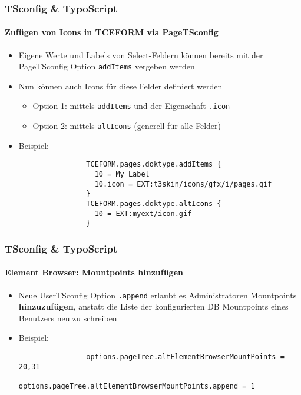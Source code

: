 \begin{frame}[fragile]
	\frametitle{TSconfig \& TypoScript}
	\framesubtitle{Zufügen von Icons in TCEFORM via PageTSconfig}

	\begin{itemize}
		\item Eigene Werte und Labels von Select-Feldern können bereits mit der PageTSconfig Option \texttt{addItems} vergeben werden
		\item Nun können auch Icons für diese Felder definiert werden

			\begin{itemize}
				\item Option 1: mittels \texttt{addItems} und der Eigenschaft \texttt{.icon}
				\item Option 2: mittels \texttt{altIcons} (generell für alle Felder)
			\end{itemize}

		\item Beispiel:

			\begin{lstlisting}
				TCEFORM.pages.doktype.addItems {
				  10 = My Label
				  10.icon = EXT:t3skin/icons/gfx/i/pages.gif
				}
				TCEFORM.pages.doktype.altIcons {
				  10 = EXT:myext/icon.gif
				}
			\end{lstlisting}

	\end{itemize}

\end{frame}


\begin{frame}[fragile]
	\frametitle{TSconfig \& TypoScript}
	\framesubtitle{Element Browser: Mountpoints hinzufügen}

	\begin{itemize}
		\item Neue UserTSconfig Option \texttt{.append} erlaubt es Administratoren Mountpoints
			\textbf{hinzuzufügen}, anstatt die Liste der konfigurierten DB Mountpoints eines
			Benutzers neu zu schreiben

		\item Beispiel:

			\begin{lstlisting}
				options.pageTree.altElementBrowserMountPoints = 20,31
				options.pageTree.altElementBrowserMountPoints.append = 1
			\end{lstlisting}

	\end{itemize}

\end{frame}

